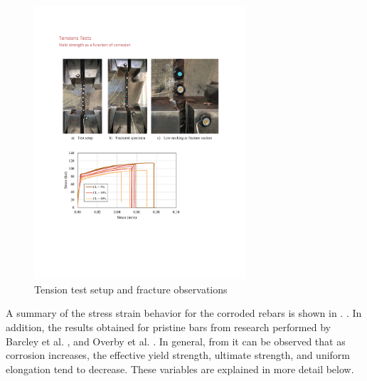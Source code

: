 \begin{figure}[htbp]
	\centering
	\includegraphics[width=0.7\textwidth]{VAC Thesis 2.0/Chapter-4/figs/TensionTest_images.pdf}
	\caption{Tension test setup and fracture observations}
	\label{fig:TensionTest_NoNecking}
\end{figure}

A summary of the stress strain behavior for the corroded rebars is shown in . . In addition, the results obtained for pristine bars from research performed by Barcley et al.  \cite{Barcley2018}, and Overby et al. \cite{Overby2016}. In general, from  it can be observed that as corrosion increases, the effective yield strength, ultimate strength, and uniform elongation tend to decrease. These variables are explained in more detail below.

